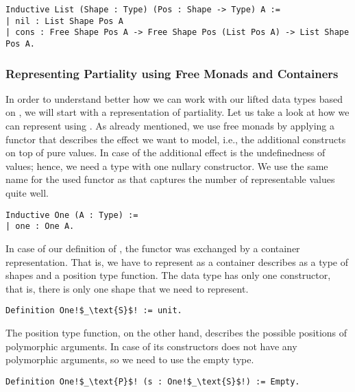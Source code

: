 \begin{verbatim}
Inductive List (Shape : Type) (Pos : Shape -> Type) A :=
| nil : List Shape Pos A
| cons : Free Shape Pos A -> Free Shape Pos (List Pos A) -> List Shape Pos A.
\end{verbatim}

\subsubsection{Representing Partiality using Free Monads and Containers}
\label{subsub:partiality_container}

In order to understand better how we can work with our lifted data
types based on , we will start with a representation of
partiality.
Let us take a look at how we can represent  using
.
As already mentioned, we use free monads by applying a functor
 that describes the effect we want to model, i.e., the
additional constructs on top of pure values.
In case of  the additional effect is the undefinedness
of values; hence, we need a type with one nullary constructor.
We use the same name for the used functor as \citet{swierstra2008data}
that captures the number of representable values quite well.

\begin{verbatim}
Inductive One (A : Type) :=
| one : One A.
\end{verbatim}

In case of our definition of , the functor was exchanged by
a container representation.
That is, we have to represent  as a container
describes as a type of shapes and a position type function.
The data type  has only one constructor, that is,
there is only one shape that we need to represent.

\begin{verbatim}
Definition One!$_\text{S}$! := unit.
\end{verbatim}

The position type function, on the other hand, describes the possible
positions of polymorphic arguments.
In case of  its constructors does not have any
polymorphic arguments, so we need to use the empty type.

\begin{verbatim}
Definition One!$_\text{P}$! (s : One!$_\text{S}$!) := Empty.
\end{verbatim}

